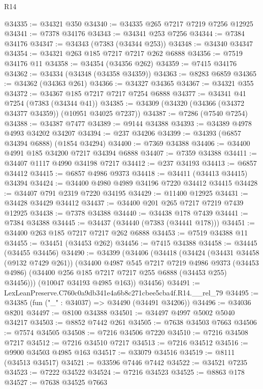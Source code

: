 \begin{lexlean}{R14}
\begin{coremodule}
@34335 := @34321 @350
@34340 := @34335 @265 @7217 @7219 @7256 @12925
@34341 := @7378 @34176
@34343 := @34341 @253 @7256
@34344 := @7384 @34176
@34347 := @34343 (@7383 (@34344 @253))
@34348 := @34340 @34347
@34354 := @34321 @263 @185 @7217 @7217 @262 @6888
@34356 := @7519 @34176 @11
@34358 := @34354 (@34356 @262)
@34359 := @7415 @34176
@34362 := @34334 (@34348 (@34358 @34359))
@34363 := @8283 @6859
@34365 := @34362 (@34363 @261)
@34366 := @34327 @34365
@34367 := @34321 @355
@34372 := @34367 @185 @7217 @7217 @7254 @6888
@34377 := @34341 @41 @7254 (@7383 (@34344 @41))
@34385 := @34309 (@34320 (@34366 (@34372 @34377 @34359)) (@10951 @34025 @7237))
@34387 := @7286 (@7540 @7254)
@34388 := @34387 @7477
@34389 := @9144 @34388
@34393 := @34389 @4978 @4993 @34202 @34207
@34394 := @237 @34206
@34399 := @34393 (@6857 @34394 @6888) (@1854 @34294)
@34400 := @7369 @34388
@34406 := @34400 @4991 @185 @34200 @7217 @34394 @6888
@34407 := @7359 @34388
@34411 := @34407 @1117 @4990 @34198 @7217
@34412 := @237 @34193
@34413 := @6857 @34412
@34415 := @6857 @4986 @9373
@34418 := @34411 (@34413 @34415) @34394
@34424 := @34400 @4980 @4989 @34196 @7220 @34412 @34415
@34428 := @34407 @791 @2319 @7220 @34195
@34429 := @11400 @12925
@34431 := @34428 @34429 @34412
@34437 := @34400 @201 @265 @7217 @7219 @7439 @12925
@34438 := @7378 @34388
@34440 := @34438 @178 @7439
@34441 := @7384 @34388
@34445 := @34437 (@34440 (@7383 (@34441 @178)))
@34451 := @34400 @263 @185 @7217 @7217 @262 @6888
@34453 := @7519 @34388 @11
@34455 := @34451 (@34453 @262)
@34456 := @7415 @34388
@34458 := @34445 (@34455 @34456)
@34490 := @34399
    (@34406
      (@34418
        (@34424
          (@34431 @34458 (@9132 @7429 @261))
          (@34400
            @4987
            @545
            @7217
            @7219
            @4986
            @9373
            (@34453 @4986)
            (@34400 @256 @185 @7217 @7217 @255 @6888 (@34453 @255) @34456)))
        (@10047 @34193 @4985 @163))
      @34456)
@34491 := LexLeanPreserve.C760c0a9db341e4a6b8c271cbee5cba4f.R14.__rel_79
@34495 := @34385 (fun ("_" : @34037) => @34490 (@34491 @34206))
@34496 := @34036 @8201
@34497 := @8100 @34388
@34501 := @34497 @4997 @5002 @5040 @34217
@34503 := @8852 @7442 @261
@34505 := @7638 @34503 @7663
@34506 := @7574 @34505
@34508 := @7216 @34506 @7220
@34510 := @7216 @34508 @7217
@34512 := @7216 @34510 @7217
@34513 := @7216 @34512
@34516 := @9900 @34503 @4985 @163
@34517 := @33079 @34516
@34519 := @8111 (@34513 @34517)
@34521 := @33596 @7446 @7442
@34522 := @34521 @7235
@34523 := @7222 @34522
@34524 := @7216 @34523
@34525 := @8863 @178
@34527 := @7638 @34525 @7663

\end{coremodule}
\end{lexlean}
